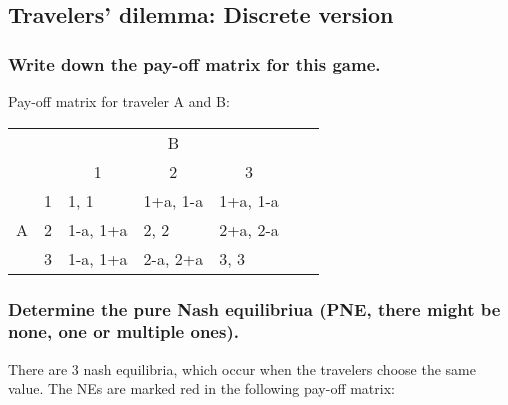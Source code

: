 \documentclass[11pt]{article}
\begin{document}
    \subsection{Travelers' dilemma: Discrete version}

    \subsubsection{Write down the pay-off matrix for this game.}
    Pay-off matrix for traveler A and B:
    \begin{table}[h]
        \centering
        \begin{tabular}{lllllll}
            & & \multicolumn{3}{c}{B} & & \\
            &                        & \multicolumn{1}{c}{1}         & \multicolumn{1}{c}{2}         & \multicolumn{1}{c}{3}         & & \\ \cline{3-5}
            \multirow{3}{*}{A} & \multicolumn{1}{r|}{1} & \multicolumn{1}{l|}{1, 1}     & \multicolumn{1}{l|}{1+a, 1-a} & \multicolumn{1}{l|}{1+a, 1-a} &  &  \\ \cline{3-5}
            & \multicolumn{1}{l|}{2} & \multicolumn{1}{l|}{1-a, 1+a} & \multicolumn{1}{l|}{2, 2}     & \multicolumn{1}{l|}{2+a, 2-a} & & \\ \cline{3-5}
            & \multicolumn{1}{l|}{3} & \multicolumn{1}{l|}{1-a, 1+a} & \multicolumn{1}{l|}{2-a, 2+a} & \multicolumn{1}{l|}{3, 3} & & \\ \cline{3-5}
        \end{tabular}
    \end{table}

    \subsubsection{Determine the pure Nash equilibriua (PNE, there might be none, one or multiple ones).}
    There are 3 nash equilibria, which occur when the travelers choose the same value. The NEs are marked red in the following pay-off matrix:
\end{document}
